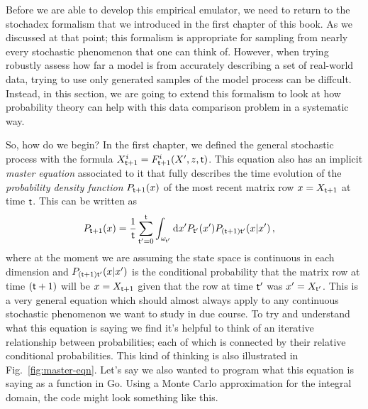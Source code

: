 Before we are able to develop this empirical emulator, we need to return to the stochadex formalism that we introduced in the first chapter of this book. As we discussed at that point; this formalism is appropriate for sampling from nearly every stochastic phenomenon that one can think of. However, when trying robustly assess how far a model is from accurately describing a set of real-world data, trying to use only generated samples of the model process can be diffcult. Instead, in this section, we are going to extend this formalism to look at how probability theory can help with this data comparison problem in a systematic way.

So, how do we begin? In the first chapter, we defined the general stochastic process with the formula $X^{i}_{{\sf t}+1} = F^{i}_{{\sf t}+1}(X',z,{\sf t})$. This equation also has an implicit \emph{master equation} associated to it that fully describes the time evolution of the \emph{probability density function} $P_{{\sf t}+1}(x)$ of the most recent matrix row $x=X_{{\sf t}+1}$ at time ${\sf t}$. This can be written as
\begin{align}
P_{{\sf t}+1}(x) &= \frac{1}{{\sf t}}\sum_{{\sf t}'=0}^{{\sf t}}\int_{\omega_{{\sf t}'}}{\rm d}x' P_{{\sf t}'}(x') P_{({\sf t}+1){\sf t}'}(x\vert x') \label{eq:master-x-cont} \,,
\end{align}
where at the moment we are assuming the state space is continuous in each dimension and $P_{({\sf t}+1){\sf t}'}(x\vert x')$ is the conditional probability that the matrix row at time $({\sf t}+1)$ will be $x=X_{{\sf t}+1}$ given that the row at time ${\sf t}'$ was $x'=X_{{\sf t}'}$. This is a very general equation which should almost always apply to any continuous stochastic phenomenon we want to study in due course. To try and understand what this equation is saying we find it's helpful to think of an iterative relationship between probabilities; each of which is connected by their relative conditional probabilities. This kind of thinking is also illustrated in Fig.~\ref{fig:master-eqn}. Let's say we also wanted to program what this equation is saying as a function in Go. Using a Monte Carlo approximation for the integral domain, the code might look something like this.

